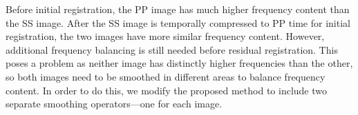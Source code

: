         Before initial registration, the PP image has much higher frequency content than the SS
        image. After the SS image is temporally compressed to PP time for initial registration, the
        two images have more similar frequency content. However, additional frequency balancing is
        still needed before residual registration. This poses a problem as neither image has
        distinctly higher frequencies than the other, so both images need to be smoothed in
        different areas to balance frequency content. In order to do this, we modify the proposed
        method to include two separate smoothing operators---one for each image.


